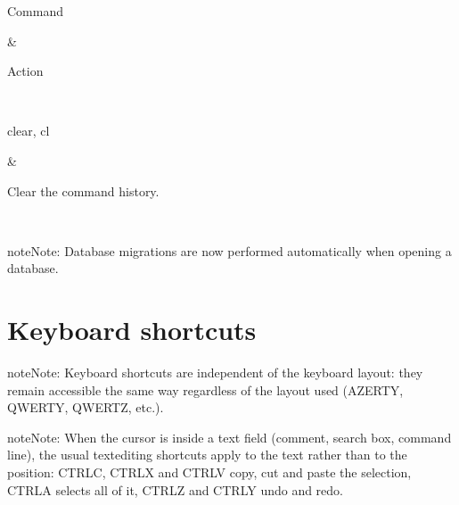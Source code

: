 \documentclass[letterpaper,10pt,english]{sphinxmanual}
\begin{document}
\begin{savenotes}\sphinxattablestart
\sphinxthistablewithglobalstyle
\centering
\begin{tabular}[t]{}
\sphinxtoprule
\begin{varwidth}[t]{}
\sphinxstyletheadfamily \sphinxAtStartPar
Command
\sphinxbeforeendvarwidth
\end{varwidth}%
&\begin{varwidth}[t]{}
\sphinxstyletheadfamily \sphinxAtStartPar
Action
\sphinxbeforeendvarwidth
\end{varwidth}%
\\
\sphinxmidrule
\sphinxtableatstartofbodyhook\begin{varwidth}[t]{}
\sphinxAtStartPar
clear, cl
\sphinxbeforeendvarwidth
\end{varwidth}%
&\begin{varwidth}[t]{}
\sphinxAtStartPar
Clear the command history.
\sphinxbeforeendvarwidth
\end{varwidth}%
\\
\sphinxbottomrule
\end{tabular}
\sphinxtableafterendhook\par
\sphinxattableend\end{savenotes}

\begin{sphinxadmonition}{note}{Note:}
\sphinxAtStartPar
Database migrations are now performed automatically when opening a database.
\end{sphinxadmonition}

\sphinxstepscope


\section{Keyboard shortcuts}
\label{\detokenize{raccourcis:raccourcis-clavier}}\label{\detokenize{raccourcis:raccourcis}}\label{\detokenize{raccourcis::doc}}
\begin{sphinxadmonition}{note}{Note:}
\sphinxAtStartPar
Keyboard shortcuts are independent of the keyboard layout: they remain accessible the same way regardless of the layout used (AZERTY, QWERTY, QWERTZ, etc.).
\end{sphinxadmonition}

\begin{sphinxadmonition}{note}{Note:}
\sphinxAtStartPar
When the cursor is inside a text field (comment, search box, command line), the usual text\sphinxhyphen{}editing shortcuts apply to the text rather than to the position: CTRL\sphinxhyphen{}C, CTRL\sphinxhyphen{}X and CTRL\sphinxhyphen{}V copy, cut and paste the selection, CTRL\sphinxhyphen{}A selects all of it, CTRL\sphinxhyphen{}Z and CTRL\sphinxhyphen{}Y undo and redo.
\end{sphinxadmonition}
\end{document}
